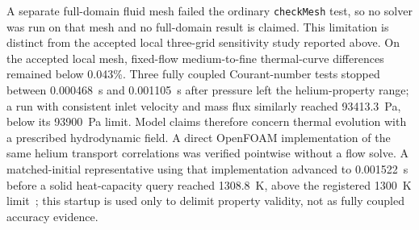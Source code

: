 A separate full-domain fluid mesh failed the ordinary \texttt{checkMesh} test, so no solver was run on that mesh and no full-domain result is claimed. This limitation is distinct from the accepted local three-grid sensitivity study reported above. On the accepted local mesh, fixed-flow medium-to-fine thermal-curve differences remained below 0.043\%. Three fully coupled Courant-number tests stopped between \SI{0.000468}{s} and \SI{0.001105}{s} after pressure left the helium-property range; a run with consistent inlet velocity and mass flux similarly reached \SI{93413.3}{Pa}, below its \SI{93900}{Pa} limit. Model claims therefore concern thermal evolution with a prescribed hydrodynamic field. A direct OpenFOAM implementation of the same helium transport correlations was verified pointwise without a flow solve. A matched-initial representative using that implementation advanced to \SI{0.001522}{s} before a solid heat-capacity query reached \SI{1308.8}{K}, above the registered \SI{1300}{K} limit~\cite{kleykamp1996enthalpy}; this startup is used only to delimit property validity, not as fully coupled accuracy evidence.
